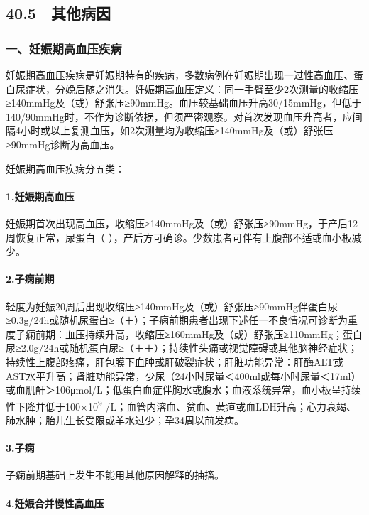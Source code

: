 \subsection{40.5　其他病因}

\subsubsection{一、妊娠期高血压疾病}

妊娠期高血压疾病是妊娠期特有的疾病，多数病例在妊娠期出现一过性高血压、蛋白尿症状，分娩后随之消失。妊娠期高血压定义：同一手臂至少2次测量的收缩压≥140mmHg及（或）舒张压≥90mmHg。血压较基础血压升高30/15mmHg，但低于140/90mmHg时，不作为诊断依据，但须严密观察。对首次发现血压升高者，应间隔4小时或以上复测血压，如2次测量均为收缩压≥140mmHg及（或）舒张压≥90mmHg诊断为高血压。

妊娠期高血压疾病分五类：

\paragraph{1.妊娠期高血压}

妊娠期首次出现高血压，收缩压≥140mmHg及（或）舒张压≥90mmHg，于产后12周恢复正常，尿蛋白（-），产后方可确诊。少数患者可伴有上腹部不适或血小板减少。

\paragraph{2.子痫前期}

轻度为妊娠20周后出现收缩压≥140mmHg及（或）舒张压≥90mmHg伴蛋白尿≥0.3g/24h或随机尿蛋白≥（＋）；子痫前期患者出现下述任一不良情况可诊断为重度子痫前期：血压持续升高，收缩压≥160mmHg及（或）舒张压≥110mmHg；蛋白尿≥2.0g/24h或随机蛋白尿≥（＋＋）；持续性头痛或视觉障碍或其他脑神经症状；持续性上腹部疼痛，肝包膜下血肿或肝破裂症状；肝脏功能异常：肝酶ALT或AST水平升高；肾脏功能异常，少尿（24小时尿量＜400ml或每小时尿量＜17ml）或血肌酐＞106μmol/L；低蛋白血症伴胸水或腹水；血液系统异常，血小板呈持续性下降并低于100×10\textsuperscript{9}
/L；血管内溶血、贫血、黄疸或血LDH升高；心力衰竭、肺水肿；胎儿生长受限或羊水过少；孕34周以前发病。

\paragraph{3.子痫}

子痫前期基础上发生不能用其他原因解释的抽搐。

\paragraph{4.妊娠合并慢性高血压}

